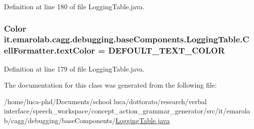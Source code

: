 Definition at line 180 of file Logging\-Table.\-java.

\hypertarget{classit_1_1emarolab_1_1cagg_1_1debugging_1_1baseComponents_1_1LoggingTable_1_1CellFormatter_ac2464203aac41fcb1c8824a25ac45f94}{
\subsubsection[{text\-Color}]{\setlength{\rightskip}{0pt plus 5cm}Color it.\-emarolab.\-cagg.\-debugging.\-base\-Components.\-Logging\-Table.\-Cell\-Formatter.\-text\-Color = {\bf D\-E\-F\-O\-U\-L\-T\-\_\-\-T\-E\-X\-T\-\_\-\-C\-O\-L\-O\-R}\hspace{0.3cm}{\ttfamily [private]}}}\label{classit_1_1emarolab_1_1cagg_1_1debugging_1_1baseComponents_1_1LoggingTable_1_1CellFormatter_ac2464203aac41fcb1c8824a25ac45f94}


Definition at line 179 of file Logging\-Table.\-java.



The documentation for this class was generated from the following file\-:\begin{DoxyCompactItemize}
\item 
/home/luca-\/phd/\-Documents/school luca/dottorato/research/verbal interface/speech\-\_\-workspace/concept\-\_\-action\-\_\-grammar\-\_\-generator/src/it/emarolab/cagg/debugging/base\-Components/\hyperlink{LoggingTable_8java}{Logging\-Table.\-java}\end{DoxyCompactItemize}
